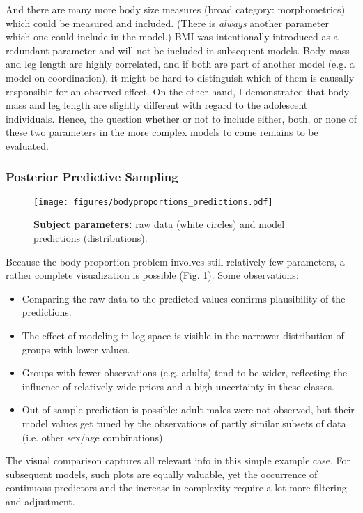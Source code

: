 And there are many more body size measures (broad category: morphometrics) which could be measured and included.
(There is \emph{always} another parameter which one could include in the model.)
BMI was intentionally introduced as a redundant parameter and will not be included in subsequent models.
Body mass and leg length are highly correlated, and if both are part of another model (e.g. a model on coordination), it might be hard to distinguish which of them is causally responsible for an observed effect.
On the other hand, I demonstrated that body mass and leg length are slightly different with regard to the adolescent individuals.
Hence, the question whether or not to include either, both, or none of these two parameters in the more complex models to come remains to be evaluated.

\subsubsection{Posterior Predictive Sampling}
\label{sec:org805e0cf}

\begin{figure}[p]
\centering
\texttt{[image: figures/bodyproportions\_predictions.pdf]}
\caption{\label{fig:bodyproportions}\textbf{Subject parameters:} raw data (white circles) and model predictions (distributions).}
\end{figure}

Because the body proportion problem involves still relatively few parameters, a rather complete visualization is possible (Fig. \ref{fig:bodyproportions}).
Some observations:
\begin{itemize}
\item Comparing the raw data to the predicted values confirms plausibility of the predictions.
\item The effect of modeling in log space is visible in the narrower distribution of groups with lower values.
\item Groups with fewer observations (e.g. adults) tend to be wider, reflecting the influence of relatively wide priors and a high uncertainty in these classes.
\item Out-of-sample prediction is possible: adult males were not observed, but their model values get tuned by the observations of partly similar subsets of data (i.e. other sex/age combinations).
\end{itemize}

The visual comparison captures all relevant info in this simple example case.
For subsequent models, such plots are equally valuable, yet the occurrence of continuous predictors and the increase in complexity require a lot more filtering and adjustment.


